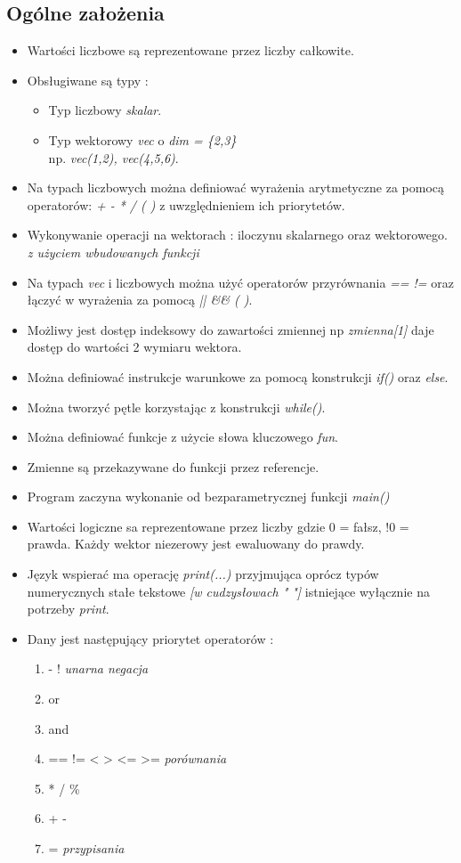 \documentclass[11pt]{article} %
\begin{document}
\subsection{Ogólne założenia}
\begin{itemize}
	\item 
		Wartości liczbowe są reprezentowane przez liczby całkowite.
	\item
		Obsługiwane są typy : 
		\begin{itemize}
			\item 
				Typ liczbowy \textsl{skalar}.
			\item
				Typ wektorowy \textsl{vec} o \textsl{dim = \{2,3\}}\\ np. \textsl{vec(1,2), vec(4,5,6)}.
		\end{itemize}
	\item
		Na typach liczbowych można definiować wyrażenia arytmetyczne za pomocą operatorów: \textsl{+ - * / ( )} z uwzględnieniem ich priorytetów.
	\item
		Wykonywanie operacji na wektorach : iloczynu skalarnego oraz wektorowego. \textsl{z użyciem wbudowanych funkcji}
	\item
		Na typach \textsl{vec} i liczbowych można użyć operatorów przyrównania \textsl{== !=} oraz łączyć w wyrażenia za pomocą \textsl{|| \&\& ( )}.
	\item
		Możliwy jest dostęp indeksowy do zawartości zmiennej np \textsl{ zmienna[1]} daje dostęp do wartości 2 wymiaru wektora. 
	\item
		Można definiować instrukcje warunkowe za pomocą konstrukcji \textsl{if()} oraz \textsl{else}.
	\item
		Można tworzyć pętle korzystając z konstrukcji \textsl{while()}.
	\item
		Można definiować funkcje z użycie słowa kluczowego \textsl{fun}.
	\item
		Zmienne są przekazywane do funkcji przez referencje.
	\item
		Program zaczyna wykonanie od bezparametrycznej funkcji \textsl{main()}
	\item 
		Wartości logiczne sa reprezentowane przez liczby gdzie 0 = fałsz, !0 = prawda. Każdy wektor niezerowy jest ewaluowany do prawdy.
	\item
		Język wspierać ma operację \textsl{print(...)} przyjmująca oprócz typów numerycznych stałe tekstowe \textsl{[w cudzysłowach " "]} istniejące wyłącznie na potrzeby \textsl{print}.
	\item
		Dany jest następujący priorytet operatorów :
		\begin{enumerate}
			\item - ! \textit{unarna negacja}
			\item or
			\item and
			\item == != < > <= >= \textit{porównania}
			\item * / \%
			\item + -
			\item = \textit{przypisania}
		\end{enumerate}
\end{itemize}
\end{document}
